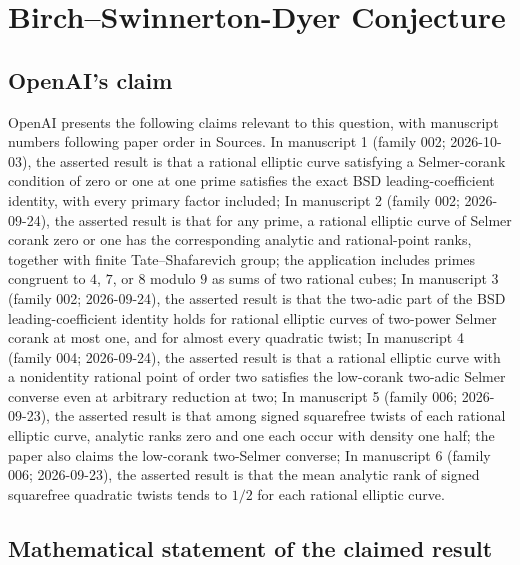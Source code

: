 \documentclass[11pt]{article}
\begin{document}
\section*{Birch–Swinnerton-Dyer Conjecture}

\subsection{OpenAI's claim}
OpenAI presents the following claims relevant to this question, with manuscript numbers following paper order in Sources. In manuscript 1 (family 002; 2026-10-03), the asserted result is that a rational elliptic curve satisfying a Selmer-corank condition of zero or one at one prime satisfies the exact BSD leading-coefficient identity, with every primary factor included; In manuscript 2 (family 002; 2026-09-24), the asserted result is that for any prime, a rational elliptic curve of Selmer corank zero or one has the corresponding analytic and rational-point ranks, together with finite Tate--Shafarevich group; the application includes primes congruent to $4$, $7$, or $8$ modulo $9$ as sums of two rational cubes; In manuscript 3 (family 002; 2026-09-24), the asserted result is that the two-adic part of the BSD leading-coefficient identity holds for rational elliptic curves of two-power Selmer corank at most one, and for almost every quadratic twist; In manuscript 4 (family 004; 2026-09-24), the asserted result is that a rational elliptic curve with a nonidentity rational point of order two satisfies the low-corank two-adic Selmer converse even at arbitrary reduction at two; In manuscript 5 (family 006; 2026-09-23), the asserted result is that among signed squarefree twists of each rational elliptic curve, analytic ranks zero and one each occur with density one half; the paper also claims the low-corank two-Selmer converse; In manuscript 6 (family 006; 2026-09-23), the asserted result is that the mean analytic rank of signed squarefree quadratic twists tends to $1/2$ for each rational elliptic curve.

\subsection{Mathematical statement of the claimed result}
\end{document}
